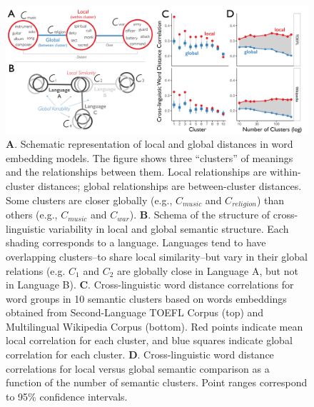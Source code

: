 \documentclass[9pt,twocolumn,twoside,lineno]{pnas-new}
\begin{document}
\begin{figure}[t!]
\centering
\includegraphics[width=16cm]{figs/Fig3.png}
\caption{{\textbf A.} Schematic representation of local and global distances in word embedding models. The figure shows three ``clusters'' of meanings and the relationships between them. Local relationships are within-cluster distances; global relationships are between-cluster distances. Some clusters are closer globally (e.g., $C_{music}$ and $C_{religion}$) than others (e.g., $C_{music}$ and $C_{war}$). {\textbf B.} Schema of the structure of cross-linguistic variability in local and global semantic structure. Each shading corresponds to a language. Languages tend to have overlapping clusters--to share local similarity--but vary in their global relations (e.g.  $C_{1}$ and $C_{2}$ are globally close in Language A, but not in Language B). {\textbf C.} Cross-linguistic word distance correlations for word groups in 10 semantic clusters based on words embeddings obtained from Second-Language TOEFL Corpus (top) and Multilingual Wikipedia Corpus (bottom). Red points indicate mean local correlation for each cluster, and blue squares indicate global correlation for each cluster.  {\textbf D.} Cross-linguistic word distance correlations for local versus global semantic comparison as a function of the number of semantic clusters. Point ranges correspond to 95\% confidence intervals.}
\label{fig:localglobal} 
\end{figure}
\end{document}
